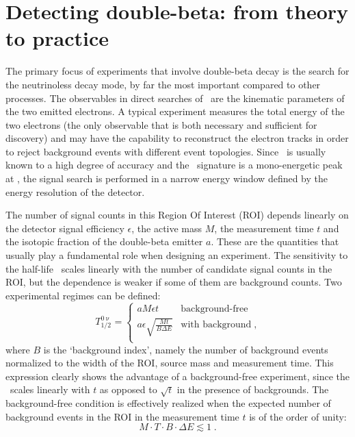 \begin{table}
  \centering
  \caption{%
    Compilation of current experimental bounds at 90\% C.L.~on the Lorentz-violating \aof\
    coefficient from double-beta decay.
  }\label{tab:nbb:2nbblv-lim}
  
\end{table}

\section{Detecting double-beta: from theory to practice}%
\label{sec:nbb:exp}

The primary focus of experiments that involve double-beta decay is the search for the
neutrinoless decay mode, by far the most important compared to other processes. The
observables in direct searches of \onbb\ are the kinematic parameters of the two emitted
electrons. A typical experiment measures the total energy of the two electrons (the only
observable that is both necessary and sufficient for discovery) and may have the
capability to reconstruct the electron tracks in order to reject background events with
different event topologies. Since \qbb\ is usually known to a high degree of accuracy and
the \onbb\ signature is a mono-energetic peak at \qbb, the signal search is performed in a
narrow energy window defined by the energy resolution of the detector.

The number of signal counts in this Region Of Interest (ROI) depends linearly on the
detector signal efficiency $\epsilon$, the active mass $M$, the measurement time $t$ and
the isotopic fraction of the double-beta emitter $a$.  These are the quantities that
usually play a fundamental role when designing an experiment. The sensitivity to the
half-life \thalfzero\ scales linearly with the number of candidate signal counts in the
ROI, but the dependence is weaker if some of them are background counts. Two experimental
regimes can be defined:
\begin{equation}\label{eq:nbb:bkglevel}
  T^{0\upnu}_{1/2} =
    \begin{cases}
      a M \epsilon t & \text{background-free} \\
      a \epsilon \sqrt{\frac{M t}{B \Delta{E}}} & \text{with background} \;, \\
    \end{cases}
\end{equation}
where $B$ is the `background index', namely the number of background events normalized to
the width of the ROI, source mass and measurement time. This expression clearly shows the
advantage of a background-free experiment, since the \thalfzero\ scales linearly with $t$
as opposed to $\sqrt{t}$ in the presence of backgrounds. The background-free condition is
effectively realized when the expected number of background events in the ROI in the
measurement time $t$ is of the order of unity:
\[
  M \cdot T \cdot B \cdot \Delta{E} \lesssim 1 \;.
\]

